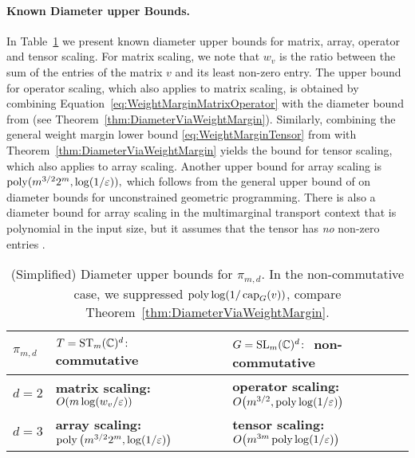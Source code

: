 \paragraph{Known Diameter upper Bounds.}
In Table~\ref{tab:DiameterBounds} we present known diameter upper bounds for matrix, array, operator and tensor scaling. For matrix scaling, we note that  $w_v$ is the ratio between the sum of the entries of the matrix $v$ and its least non-zero entry. The upper bound for operator scaling, which also applies to matrix scaling, is obtained by combining Equation~\eqref{eq:WeightMarginMatrixOperator} with the diameter bound from \cite{GradflowArXiv} (see Theorem~\ref{thm:DiameterViaWeightMargin}).
Similarly, combining the general weight margin lower bound \eqref{eq:WeightMarginTensor} from \cite[Theorem~6.9]{GradflowArXiv} with Theorem~\ref{thm:DiameterViaWeightMargin} yields the bound for tensor scaling, which also applies to array scaling.
Another upper bound for array scaling is $\operatorname{poly}(m^{3/2} 2^m, \log (1/\varepsilon)),$ which follows from the general upper bound of \cite{straszak2019computing} on diameter bounds for unconstrained geometric programming. There is also a diameter bound for array scaling in the multimarginal transport context that is polynomial in the input size, but it assumes that the tensor has \emph{no} non-zero entries \cite{lin2022complexity}.

\begin{table}[h]
	\renewcommand*{\arraystretch}{1.2}
	\begin{tabular}{ >{\centering\arraybackslash} m{1cm} ||>{\centering\arraybackslash} m{5.9cm} |>{\centering\arraybackslash} m{6.1cm}}
		$\pi_{m,d} $& $T = \operatorname{ST}_m(\mathbb C)^d \colon$ commutative & $G = \operatorname{SL}_m(\mathbb C)^d \colon$ non-commutative \\ 
		\hline \hline
		$d=2$ & \textbf{matrix scaling:} $O(m \log(w_v / \varepsilon))$ \cite{cohen2017matrix} & \textbf{operator scaling:} $O \big( m^{3/2}, \operatorname{poly}\log(1/ \varepsilon) \big)$ \cite{GradflowArXiv} \\ 
		\hline 
		$d=3$ & \textbf{array scaling:} $\operatorname{poly} \big( m^{3/2} 2^m, \log (1/\varepsilon) \big)$ \cite{straszak2019computing} & \textbf{tensor scaling:} $O \big( m^{3m} \operatorname{poly}\log (1/\varepsilon)  \big)$ \cite{GradflowArXiv}
	\end{tabular}
	\caption{(Simplified) Diameter upper bounds for $\pi_{m,d}$. In the non-commutative case, we suppressed $\operatorname{poly}\log(1/ \operatorname{cap}_G(v))$, compare Theorem~\ref{thm:DiameterViaWeightMargin}.} \label{tab:DiameterBounds}
\end{table}

